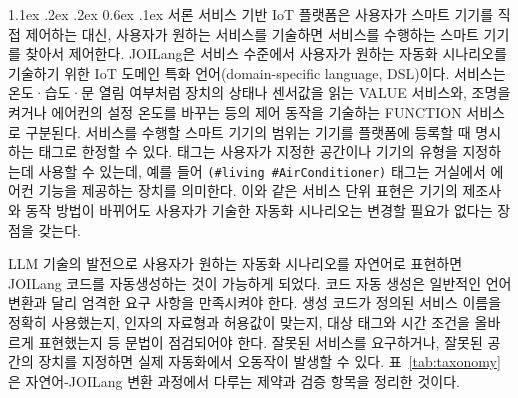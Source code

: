 \documentclass[10pt,twocolumn]{article}
\makeatletter
\newenvironment{revision}{\begingroup\color{revisionblue}}{\endgroup}
\renewcommand{\section}{\@startsection{section}{1}{\z@}%
{1.1ex \@plus .2ex \@minus .2ex}%
{0.6ex \@plus .1ex}%
{\normalfont\normalsize\bfseries}}
\makeatother
\begin{document}
\section{서론}
서비스 기반 IoT 플랫폼은 사용자가 스마트 기기를 직접 제어하는 대신, 사용자가 원하는 서비스를 기술하면 서비스를 수행하는 스마트 기기를 찾아서 제어한다\cite{SoPIoT}. JOILang은
서비스 수준에서 사용자가 원하는 자동화 시나리오를 기술하기 위한 IoT 도메인 특화 언어(domain-specific language, DSL)이다\cite{REF_JOILANG_PIPELINE}.
\begin{revision}
서비스는 온도·습도·문 열림 여부처럼 장치의 상태나 센서값을 읽는 VALUE 서비스와, 조명을 켜거나 에어컨의 설정 온도를 바꾸는 등의 제어 동작을 기술하는 FUNCTION 서비스로 구분된다. 서비스를 수행할 스마트 기기의 범위는 기기를 플랫폼에 등록할 때 명시하는 태그로 한정할 수 있다.
태그는 사용자가 지정한 공간이나 기기의 유형을 지정하는데 사용할 수 있는데, 예를 들어 \texttt{(\#living \#AirConditioner)} 태그는 거실에서 에어컨 기능을 제공하는 장치를 의미한다. 이와 같은 서비스 단위 표현은 기기의 제조사와 동작 방법이 바뀌어도 사용자가 기술한 자동화 시나리오는 변경할 필요가 없다는 장점을 갖는다\cite{REF_EDGE_ARCH}.
\end{revision}

LLM 기술의 발전으로 사용자가 원하는 자동화 시나리오를 자연어로 표현하면 JOILang 코드를 자동생성하는 것이 가능하게 되었다. 코드 자동 생성은 일반적인 언어 변환과 달리 엄격한 요구 사항을 만족시켜야 한다.
생성 코드가 정의된 서비스 이름을 정확히 사용했는지, 인자의 자료형과 허용값이 맞는지, 대상 태그와 시간 조건을 올바르게 표현했는지 등 문법이 점검되어야 한다. 잘못된 서비스를 요구하거나, 잘못된 공간의 장치를 지정하면 실제 자동화에서 오동작이 발생할 수 있다. 표~\ref{tab:taxonomy}은 자연어-JOILang 변환 과정에서 다루는 제약과 검증 항목을 정리한 것이다.
\end{document}
